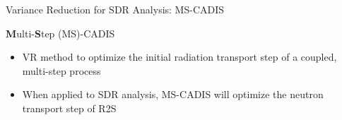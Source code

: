 \documentclass{beamer}
\begin{document}
\begin{frame}{Variance Reduction for SDR Analysis: MS-CADIS}
	\begin{block}{\textbf{M}ulti-\textbf{S}tep (MS)-CADIS \cite{mscadis}}
  \begin{itemize}
  \item {VR method to optimize the initial radiation transport step of a
	  coupled, multi-step process}
	  
	  \item{When applied to SDR analysis, MS-CADIS will optimize the
		  neutron transport step of R2S}
\end{itemize}
\end{block}
%
\end{frame}
\end{document}
